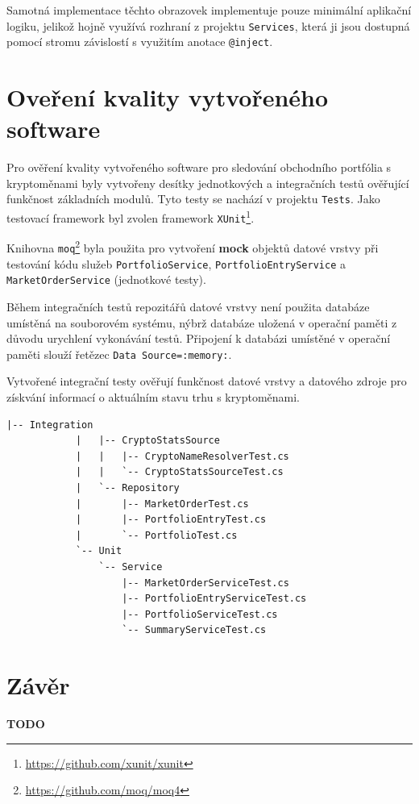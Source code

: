 \documentclass[12pt, a4paper]{article}
\begin{document}
    Samotná implementace těchto obrazovek implementuje pouze minimální aplikační logiku, jelikož hojně využívá rozhraní z projektu
    \texttt{Services}, která ji jsou dostupná pomocí stromu závislostí s využitím anotace \texttt{@inject}. 

    \section{Oveření kvality vytvořeného software}

    Pro ověření kvality vytvořeného software pro sledování obchodního portfólia s kryptoměnami byly vytvořeny desítky jednotkových a integračních testů ověřující funkčnost základních modulů. Tyto testy se nachází v projektu \texttt{Tests}. Jako testovací framework byl zvolen framework \texttt{XUnit}\footnote{\url{https://github.com/xunit/xunit}}.

    Knihovna \texttt{moq}\footnote{\url{https://github.com/moq/moq4}} byla použita pro vytvoření \textbf{mock} objektů datové vrstvy při testování kódu služeb \texttt{PortfolioService}, \texttt{PortfolioEntryService} a \texttt{MarketOrderService} (jednotkové testy).

    Během integračních testů repozitářů datové vrstvy není použita databáze umístěná na souborovém systému, nýbrž databáze uložená v operační paměti z důvodu urychlení vykonávání testů. Připojení k databázi umístěné v operační paměti slouží řetězec \texttt{Data Source=:memory:}.

    Vytvořené integrační testy ověřují funkčnost datové vrstvy a datového zdroje pro získvání informací o aktuálním stavu trhu s kryptoměnami.

    \begin{lstlisting}[caption={Struktura projektu \texttt{Tests} obsahující integrační a jednotkové testy}, captionpos=b]
            |-- Integration
            |   |-- CryptoStatsSource
            |   |   |-- CryptoNameResolverTest.cs
            |   |   `-- CryptoStatsSourceTest.cs
            |   `-- Repository
            |       |-- MarketOrderTest.cs
            |       |-- PortfolioEntryTest.cs
            |       `-- PortfolioTest.cs
            `-- Unit
                `-- Service
                    |-- MarketOrderServiceTest.cs
                    |-- PortfolioEntryServiceTest.cs
                    |-- PortfolioServiceTest.cs
                    `-- SummaryServiceTest.cs
    \end{lstlisting}
    
    \section{Závěr}
    \textbf{TODO}
    
\end{document}
